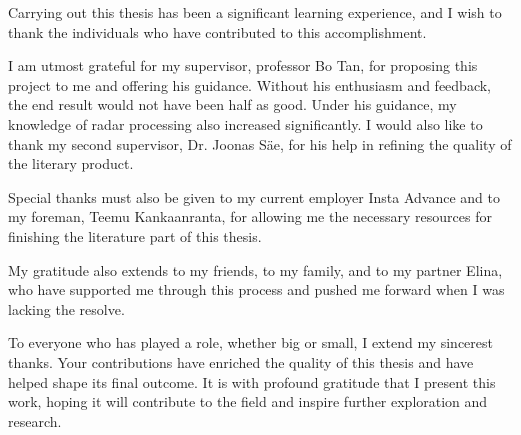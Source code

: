 Carrying out this thesis has been a significant learning experience,
and I wish to thank the individuals who have contributed to this accomplishment.

I am utmost grateful for my supervisor, professor Bo Tan, for proposing this project to me
and offering his guidance. Without his enthusiasm and feedback, the end result would not have been half as good.
Under his guidance, my knowledge of radar processing also increased significantly.
I would also like to thank my second supervisor, Dr. Joonas Säe,
for his help in refining the quality of the literary product.

Special thanks must also be given to my current employer Insta Advance
and to my foreman, Teemu Kankaanranta, for allowing me the necessary resources
for finishing the literature part of this thesis.

My gratitude also extends to my friends, to my family, and to my partner Elina,
who have supported me through this process and pushed me forward when I was lacking the resolve.

To everyone who has played a role, whether big or small, I extend my sincerest thanks.
Your contributions have enriched the quality of this thesis and have helped shape its final outcome.
It is with profound gratitude that I present this work,
hoping it will contribute to the field and inspire further exploration and research.